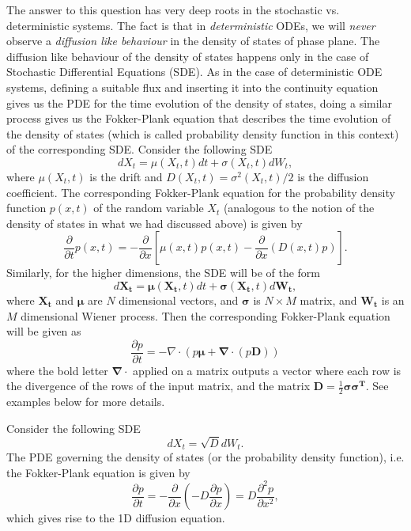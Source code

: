 \begin{observation}
	The answer to this question has very deep roots in the stochastic vs. deterministic systems. The fact is that in \emph{deterministic} ODEs, we will \emph{never} observe a \emph{diffusion like behaviour} in the density of states of phase plane. The diffusion like behaviour of the density of states happens only in the case of Stochastic Differential Equations (SDE). As in the case of deterministic ODE systems, defining a suitable flux and inserting it into the continuity equation gives us the PDE for the time evolution of the density of states, doing a similar process gives us the Fokker-Plank equation that describes the time evolution of the density of states (which is called probability density function in this context) of the corresponding SDE. Consider the following SDE
	\[ dX_t = \mu(X_t,t)dt + \sigma(X_t,t)dW_t, \]
	where $ \mu(X_t,t) $ is the drift and $ D(X_t,t) = \sigma^2(X_t,t)/2 $ is the diffusion coefficient. The corresponding Fokker-Plank equation for the probability density function $ p(x,t) $ of the random variable $ X_t $ (analogous to the notion of the density of states in what we had discussed above) is given by
	\[ \frac{\partial}{\partial t} p(x,t) = -\frac{\partial}{\partial x}[\mu(x,t)p(x,t) - \frac{\partial}{\partial x}(D(x,t)p)]. \]
	Similarly, for the higher dimensions, the SDE will be of the form
	\[ d\mathbf{X_t} = \boldsymbol{\mu}(\mathbf{X_t},t)dt + \boldsymbol{\sigma}(\mathbf{X_t},t)d\mathbf{W_t}, \]
	where $ \mathbf{X_t} $ and $ \boldsymbol{\mu} $ are $ N $ dimensional vectors, and $ \boldsymbol{\sigma} $ is $ N\times M $ matrix, and $ \mathbf{W_t} $ is an $ M $ dimensional Wiener process. Then the corresponding Fokker-Plank equation will be given as
	\[ \frac{\partial p}{\partial t} = -\nabla\cdot(p\boldsymbol{\mu} + \boldsymbol{\nabla}\cdot(p\mathbf{D})) \]
	where the bold letter $ \boldsymbol{\nabla}\cdot$  applied on a matrix outputs a vector where each row is the divergence of the rows of the input matrix, and the matrix $ \mathbf{D} = \frac{1}{2}\boldsymbol{\sigma}\boldsymbol{\sigma^T} $. See examples below for more details.
\end{observation}

\begin{example}
	Consider the following SDE
	\[ dX_t = \sqrt{D}dW_t. \]
	The PDE governing the density of states (or the probability density function), i.e. the Fokker-Plank equation is given by
	\[ \frac{\partial p}{\partial t} = -\frac{\partial}{\partial x} (-D \frac{\partial p}{\partial x}) = D\frac{\partial ^2 p}{\partial x^2}, \]
	which gives rise to the 1D diffusion equation.
\end{example}

